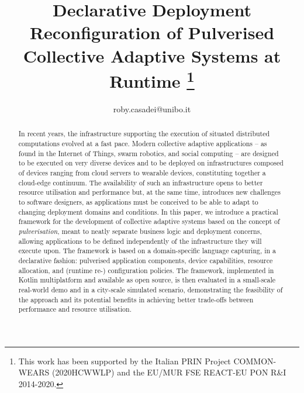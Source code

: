 \documentclass[conference]{IEEEtran}
\begin{document}
\title{Declarative Deployment Reconfiguration of Pulverised Collective Adaptive Systems at Runtime
\thanks{
    This work has been supported by the Italian PRIN Project COMMON-WEARS (2020HCWWLP) and the EU/MUR FSE REACT-EU PON R\&I 2014-2020.
}
}

\author{
roby.casadei@unibo.it
}

\maketitle

\begin{abstract}
In recent years,
the infrastructure supporting the execution of situated distributed computations
evolved at a fast pace.
%
Modern collective adaptive applications -- as found in the Internet of Things, swarm robotics, and social computing -- are designed to be executed on very diverse devices
and to be deployed on infrastructures composed of devices ranging from cloud servers to wearable devices,
constituting together a cloud-edge continuum.
%
The availability of such an infrastructure opens to better resource utilisation and performance
but, at the same time, introduces new challenges to software designers,
as applications must be conceived to be able to adapt to changing deployment domains and conditions.
%
In this paper,
we introduce a practical framework for the development of collective adaptive systems
based on the concept of \emph{pulverisation},
meant to neatly separate business logic and deployment concerns,
allowing applications to be defined independently of the infrastructure they will execute upon.
%
The framework is based on a domain-specific language capturing, in a declarative fashion:
pulverised application components, device capabilities, resource allocation, and (runtime re-) configuration policies.
%
The framework, implemented in Kotlin multiplatform and available as open source,
is then evaluated in a small-scale real-world demo and in a city-scale simulated scenario,
demonstrating the feasibility of the approach
and its potential benefits in achieving better trade-offs between performance and resource utilisation.
\end{abstract}
\end{document}
